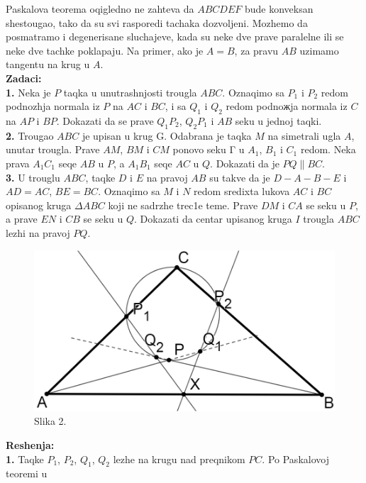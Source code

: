 \documentclass[11pt,letter]{article}
\begin{document}
\begin{flushleft}
Paskalova teorema oqigledno ne zahteva da $ABCDEF$ bude konveksan shestougao, tako da su svi rasporedi tachaka dozvoljeni. Mozhemo da posmatramo i degenerisane sluchajeve, kada su neke dve prave paralelne ili se neke dve tachke poklapaju. Na primer, ako je $A = B$, za pravu $AB$ uzimamo tangentu na krug u $A$.\\[10mm]
\textbf{Zadaci:}\\[5mm]
\textbf{1.} Neka je $P$ taqka u unutrashnjosti trougla $ABC$. Oznaqimo sa $P_1$ i $P_2$ redom podnozhja
normala iz $P$ na $AC$ i $BC$, i sa $Q_1$ i $Q_2$ redom podnoжja normala iz $C$ na $AP$ i $BP$.
Dokazati da se prave $Q_1P_2$, $Q_2P_1$ i $AB$ seku u jednoj taqki.\\[5mm]
\textbf{2.} Trougao $ABC$ je upisan u krug G. Odabrana je taqka $M$ na simetrali ugla $A$, unutar
trougla. Prave $AM$, $BM$ i $CM$ ponovo seku Γ u $A_1$, $B_1$ i $C_1$ redom. Neka prava $A_1C_1$
seqe $AB$ u $P$, a $A_1B_1$ seqe $AC$ u $Q$. Dokazati da je $PQ\parallel BC$.\\[5mm]
\textbf{3.} U trouglu $ABC$, taqke $D$ i $E$ na pravoj $AB$ su takve da je $D-A-B-E$ i $AD = AC$,
$BE = BC$. Oznaqimo sa $M$ i $N$ redom sredixta lukova $AC$ i $BC$ opisanog kruga
$\Delta ABC$ koji ne sadrzhe trec1e teme. Prave $DM$ i $CA$ se seku u $P$, a prave $EN$ i $CB$
se seku u $Q$. Dokazati da centar upisanog kruga $I$ trougla $ABC$ lezhi na pravoj $PQ$.
\end{flushleft}
\newpage
\par
\begin{figure}
\centering
\includegraphics[scale=0.3]{Paskal1.PNG}
\caption*{Slika 2.}
\end{figure}
\textbf{Reshenja:}\\[5mm]
\textbf{1.} Taqke $P_1$, $P_2$, $Q_1$, $Q_2$ lezhe na krugu nad preqnikom $PC$. Po Paskalovoj teoremi u
\end{document}
